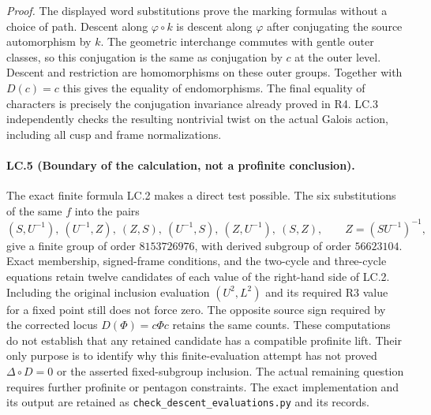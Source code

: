 \emph{Proof.}
The displayed word substitutions prove the marking formulas
without a choice of path. Descent along $\varphi\circ k$ is descent
along $\varphi$ after conjugating the source automorphism by $k$.
The geometric interchange commutes with gentle outer classes, so
this conjugation is the same as conjugation by $c$ at the outer
level. Descent and restriction are homomorphisms on these outer
groups. Together with $D(c)=c$ this gives the equality of
endomorphisms. The final equality of characters is precisely the
conjugation invariance already proved in R4. LC.3 independently
checks the resulting nontrivial twist on the actual Galois action,
including all cusp and frame normalizations.

\paragraph{LC.5 (Boundary of the calculation, not a profinite conclusion).}
The exact finite formula LC.2 makes a direct test possible. The
six substitutions of the same $f$ into the pairs
\[
 (S,U^{-1}),\ (U^{-1},Z),\ (Z,S),\
 (U^{-1},S),\ (Z,U^{-1}),\ (S,Z),\qquad Z=(SU^{-1})^{-1},
\]
give a finite group of order $8153726976$, with derived subgroup of
order $56623104$. Exact membership, signed-frame conditions, and
the two-cycle and three-cycle equations retain twelve candidates
of each value of the right-hand side of LC.2. Including the original
inclusion evaluation $(U^2,L^2)$ and its required R3 value for a fixed
point still does not force zero. The opposite source sign required by
the corrected locus $D(\Phi)=c\Phi c$ retains the same counts.
These computations do not establish
that any retained candidate has a compatible profinite lift. Their
only purpose is to identify why this finite-evaluation attempt has
not proved $\Delta\circ D=0$ or the asserted fixed-subgroup inclusion.
The actual remaining question requires further profinite or pentagon
constraints. The exact implementation and its output are retained
as \texttt{check\_descent\_evaluations.py} and its records.
